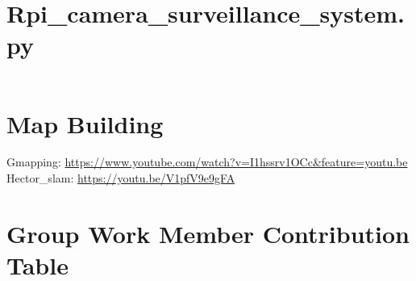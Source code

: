 \documentclass[12pt]{report}
\begin{document}


\newpage
\appendix
\chapter{Rpi\_camera\_surveillance\_system.py}
\inputminted{octave}{Rpi_camera_surveillance_system.py}
\chapter{Map Building}
Gmapping: \url{https://www.youtube.com/watch?v=I1hssrv1OCc&feature=youtu.be}
\newline
\newline
Hector\_slam: \url{https://youtu.be/V1pfV9e9gFA}
\chapter{Group Work Member Contribution Table}
\end{document}
